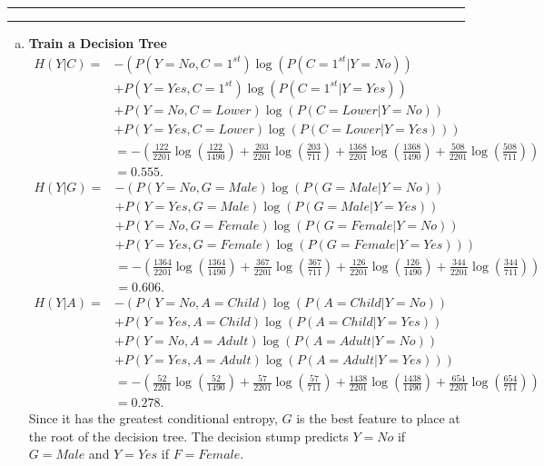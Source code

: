 \documentclass[11pt]{article}
\newcounter{questionCounter}
\newcounter{partCounter}[questionCounter]
\newenvironment{question}[2][\arabic{questionCounter}]{%
    \setcounter{partCounter}{0}%
    \vspace{.25in} \hrule \vspace{0.5em}%
        \noindent{\bf #2}%
    \vspace{0.8em} \hrule \vspace{.10in}%
}{}
\begin{document}
\begin{question}{Decision Trees}
\begin{enumerate}[(a)]
\item {\bf Train a Decision Tree} \\
\begin{align*}
H(Y | C) =
 & -\left(
            P(Y = No,  C = 1^{st})\log(P(C = 1^{st} | Y = No )) \right.  \\
 &        + P(Y = Yes, C = 1^{st})\log(P(C = 1^{st} | Y = Yes))         \\
 &        + P(Y = No,  C = Lower) \log(P(C = Lower  | Y = No ))         \\
 & \left. + P(Y = Yes, C = Lower) \log(P(C = Lower  | Y = Yes)) \right) \\
 & = -\left( \frac{122}{2201} \log\left(\frac{122}{1490}\right)
          +  \frac{203}{2201} \log\left(\frac{203}{711}\right)
          +  \frac{1368}{2201}\log\left(\frac{1368}{1490}\right)
          +  \frac{508}{2201} \log\left(\frac{508}{711}\right)\right)   \\
 & = 0.555.
\end{align*}
\begin{align*}
H(Y | G) =
 & -\left(
            P(Y = No,  G = Male)   \log(P(G = Male | Y = No )) \right.  \\
 &        + P(Y = Yes, G = Male)   \log(P(G = Male | Y = Yes))         \\
 &        + P(Y = No,  G = Female) \log(P(G = Female  | Y = No ))         \\
 & \left. + P(Y = Yes, G = Female) \log(P(G = Female  | Y = Yes)) \right) \\
 & = -\left( \frac{1364}{2201} \log\left(\frac{1364}{1490}\right)
          +  \frac{367}{2201}  \log\left(\frac{367}{711}\right)
          +  \frac{126}{2201}  \log\left(\frac{126}{1490}\right)
          +  \frac{344}{2201}  \log\left(\frac{344}{711}\right)\right)   \\
 & = 0.606.
\end{align*}
\begin{align*}
H(Y | A) =
 & -\left(
            P(Y = No,  A = Child) \log(P(A = Child  | Y = No )) \right.  \\
 &        + P(Y = Yes, A = Child) \log(P(A = Child  | Y = Yes))         \\
 &        + P(Y = No,  A = Adult) \log(P(A = Adult  | Y = No ))         \\
 & \left. + P(Y = Yes, A = Adult) \log(P(A = Adult  | Y = Yes)) \right) \\
 & = -\left( \frac{52}{2201}  \log\left(\frac{52}{1490}\right)
          +  \frac{57}{2201}  \log\left(\frac{57}{711}\right)
          +  \frac{1438}{2201}\log\left(\frac{1438}{1490}\right)
          +  \frac{654}{2201} \log\left(\frac{654}{711}\right)\right)   \\
 & = 0.278.
\end{align*}
Since it has the greatest conditional entropy, $G$ is the best feature to
place at the root of the decision tree. The decision stump predicts $Y = No$
if $G = Male$ and $Y = Yes$ if $F = Female$.


\end{enumerate}
\end{question}
\end{document}
